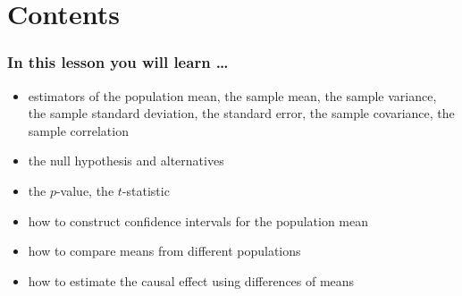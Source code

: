 

\section{Contents}


\begin{frame}
  \frametitle{In this lesson you will learn \dots}
  \begin{itemize}
  \item estimators of the population mean, the sample mean, the sample variance, the sample standard deviation, the standard error, the sample covariance, the sample correlation
  \item the null hypothesis and alternatives
  \item the $p$-value, the $t$-statistic
  \item how to construct confidence intervals for the population mean
  \item how to compare means from different populations
  \item how to estimate the causal effect using differences of means
  \end{itemize}
\end{frame}

